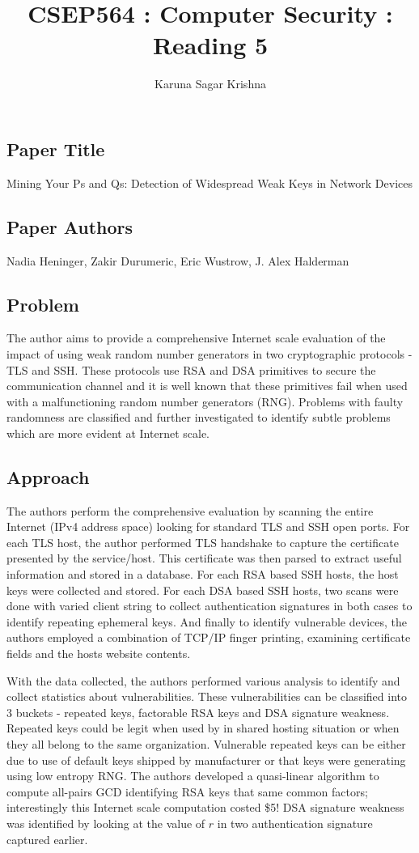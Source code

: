 \documentclass[12pt]{article}
\title{CSEP564 : Computer Security : Reading 5}
\author{Karuna Sagar Krishna}
\begin{document}
    \maketitle

    \subsection*{Paper Title}
    Mining Your Ps and Qs: Detection of Widespread Weak Keys in Network Devices

    \subsection*{Paper Authors}
    Nadia Heninger, Zakir Durumeric, Eric Wustrow, J. Alex Halderman

    \subsection*{Problem}
    The author aims to provide a comprehensive Internet scale evaluation of the impact of using weak random number generators in two cryptographic protocols - TLS and SSH. These protocols use RSA and DSA primitives to secure the communication channel and it is well known that these primitives fail when used with a malfunctioning random number generators (RNG). Problems with faulty randomness are classified and further investigated to identify subtle problems which are more evident at Internet scale.

    \subsection*{Approach}
    The authors perform the comprehensive evaluation by scanning the entire Internet (IPv4 address space) looking for standard TLS and SSH open ports. For each TLS host, the author performed TLS handshake to capture the certificate presented by the service/host. This certificate was then parsed to extract useful information and stored in a database. For each RSA based SSH hosts, the host keys were collected and stored. For each DSA based SSH hosts, two scans were done with varied client string to collect authentication signatures in both cases to identify repeating ephemeral keys. And finally to identify vulnerable devices, the authors employed a combination of TCP/IP finger printing, examining certificate fields and the hosts website contents.

    With the data collected, the authors performed various analysis to identify and collect statistics about vulnerabilities. These vulnerabilities can be classified into 3 buckets - repeated keys, factorable RSA keys and DSA signature weakness. Repeated keys could be legit when used by in shared hosting situation or when they all belong to the same organization. Vulnerable repeated keys can be either due to use of default keys shipped by manufacturer or that keys were generating using low entropy RNG. The authors developed a quasi-linear algorithm to compute all-pairs GCD identifying RSA keys that same common factors; interestingly this Internet scale computation costed \$5! DSA signature weakness was identified by looking at the value of $r$ in two authentication signature captured earlier.
\end{document}
